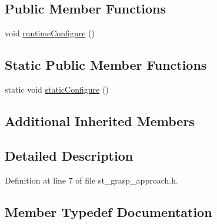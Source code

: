 \subsection*{Public Member Functions}
\begin{DoxyCompactItemize}
\item 
void \hyperlink{structsm__panda__moveit_1_1pick__states_1_1StGraspApproach_a7acd876063ef2f90614f4f31ce39a95d}{runtime\+Configure} ()
\end{DoxyCompactItemize}
\subsection*{Static Public Member Functions}
\begin{DoxyCompactItemize}
\item 
static void \hyperlink{structsm__panda__moveit_1_1pick__states_1_1StGraspApproach_add6c7e3c780c1ad8b75b72822c6412a8}{static\+Configure} ()
\end{DoxyCompactItemize}
\subsection*{Additional Inherited Members}


\subsection{Detailed Description}


Definition at line 7 of file st\+\_\+grasp\+\_\+approach.\+h.



\subsection{Member Typedef Documentation}
\mbox{\label{structsm__panda__moveit_1_1pick__states_1_1StGraspApproach_ae6bca0382acc2309654ca8a12e6f05f8}} 
